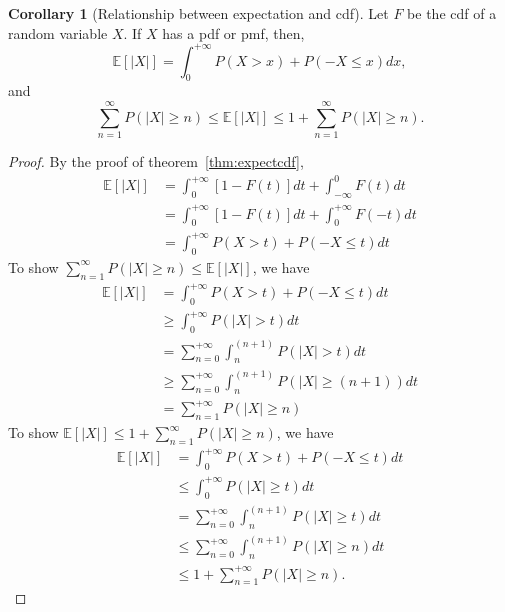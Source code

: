 \documentclass[11pt]{article}
\theoremstyle{plain}
\theoremstyle{definition}
\newtheorem{cor}{Corollary}
\begin{document}
\begin{cor}[Relationship between expectation and cdf]\label{cor:expectcdf}
Let $F$ be the cdf of a random variable $X$. If $X$ has a pdf or pmf, then,
\[  \mathbb{E}[|X|] =  \int_{0}^{+\infty} P(X > x) + P(-X \leq x) dx, \] 
	and \[  \sum_{n=1}^{\infty} P(|X| \geq n) \leq \mathbb{E}[|X|] \leq 1 + \sum_{n=1}^{\infty} P(|X| \geq n). \]
\end{cor}
\begin{proof}
	By the proof of theorem~\ref{thm:expectcdf}, 
	\begin{align}
		\mathbb{E}[|X|] &= \int_{0}^{+\infty} [1 - F(t)] dt + \int_{-\infty}^0 F(t) dt\\
		&= \int_{0}^{+\infty} [1 - F(t)] dt + \int_{0}^{+\infty} F(-t) dt\\
		&= \int_{0}^{+\infty}  P( X > t ) + P( -X \leq t )  dt
	\end{align}
	To show $ \sum_{n=1}^{\infty} P(|X| \geq n) \leq \mathbb{E}[|X|]$, we have
	\begin{align}
		\mathbb{E}[|X|] &= \int_{0}^{+\infty}  P( X > t ) + P( -X \leq t )  dt\\
		&\geq \int_{0}^{+\infty}  P(| X |> t )  dt\\
		&= \sum_{n = 0}^{+\infty} \int_{n}^{(n+1)}  P(| X |> t )  dt\\
		&\geq \sum_{n = 0}^{+\infty} \int_{n}^{(n+1)}  P(| X |\geq (n+1) )  dt\\
		&= \sum_{n=1}^{+\infty}  P(| X |\geq n ) 
	\end{align} 
	To show $\mathbb{E}[|X|] \leq 1 + \sum_{n=1}^{\infty} P(|X| \geq n)$, we have
	\begin{align}
		\mathbb{E}[|X|] &= \int_{0}^{+\infty}  P( X > t ) + P( -X \leq t )  dt\\
		&\leq \int_{0}^{+\infty}  P(| X |\geq  t )  dt\\
		&= \sum_{n = 0}^{+\infty} \int_{n}^{(n+1)}  P(| X |\geq t )  dt\\
		&\leq \sum_{n = 0}^{+\infty} \int_{n}^{(n+1)}  P(| X |\geq n )  dt\\
		&\leq 1+ \sum_{n = 1}^{+\infty}  P(| X |\geq n ) .
	\end{align}
\end{proof}
\end{document}
